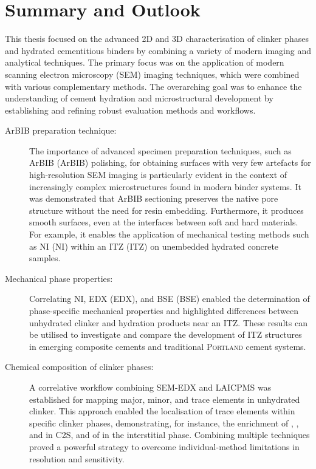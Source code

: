 \chapter{Summary and Outlook}

This thesis focused on the advanced 2D and 3D characterisation of clinker phases and hydrated cementitious binders by combining a variety of modern imaging and analytical techniques.
The primary focus was on the application of modern scanning electron microscopy (\ac{SEM}) imaging techniques, which were combined with various complementary methods.
The overarching goal was to enhance the understanding of cement hydration and microstructural development by establishing and refining robust evaluation methods and workflows.

\begin{description}

    \item[\ac{ArBIB} preparation technique:]
    The importance of advanced specimen preparation techniques, such as \acl{ArBIB} (\acs{ArBIB}) polishing, for obtaining surfaces with very few artefacts for high-resolution \ac{SEM} imaging is particularly evident in the context of increasingly complex microstructures found in modern binder systems.
    It was demonstrated that \ac{ArBIB} sectioning preserves the native pore structure without the need for resin embedding.
    Furthermore, it produces smooth surfaces, even at the interfaces between soft and hard materials.
    For example, it enables the application of mechanical testing methods such as \acl{NI} (\acs{NI}) within an \acl{ITZ} (\acs{ITZ}) on unembedded hydrated concrete samples.

    \item[Mechanical phase properties:] %
    Correlating \ac{NI}, \acl{EDX} (\acs{EDX}), and \acl{BSE} (\acs{BSE}) enabled the determination of phase-specific mechanical properties and highlighted differences between unhydrated clinker and hydration products near an \ac{ITZ}.
    These results can be utilised to investigate and compare the development of \ac{ITZ} structures in emerging composite cements and traditional \textsc{Portland} cement systems.

    \item[Chemical composition of clinker phases:]
    A correlative workflow combining \ac{SEM}-\ac{EDX} and \acl{LAICPMS} was established for mapping major, minor, and trace elements in unhydrated clinker.
    This approach enabled the localisation of trace elements within specific clinker phases, demonstrating, for instance, the enrichment of , , and  in \ac{C2S}, and of  in the interstitial phase.
    Combining multiple techniques proved a powerful strategy to overcome individual-method limitations in resolution and sensitivity.


\end{description}
